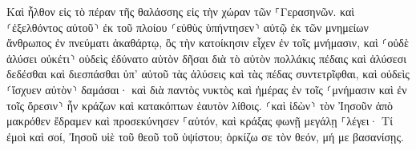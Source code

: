 \documentclass{openreader}
\begin{document}
Καὶ ἦλθον εἰς τὸ πέραν τῆς θαλάσσης εἰς τὴν χώραν τῶν ⸀Γερασηνῶν. 
καὶ ⸂ἐξελθόντος αὐτοῦ⸃ ἐκ τοῦ πλοίου ⸂εὐθὺς ὑπήντησεν⸃ αὐτῷ ἐκ τῶν μνημείων ἄνθρωπος ἐν πνεύματι ἀκαθάρτῳ, 
ὃς τὴν κατοίκησιν εἶχεν ἐν τοῖς μνήμασιν, καὶ ⸂οὐδὲ ἁλύσει οὐκέτι⸃ οὐδεὶς ἐδύνατο αὐτὸν δῆσαι 
διὰ τὸ αὐτὸν πολλάκις πέδαις καὶ ἁλύσεσι δεδέσθαι καὶ διεσπάσθαι ὑπ’ αὐτοῦ τὰς ἁλύσεις καὶ τὰς πέδας συντετρῖφθαι, καὶ οὐδεὶς ⸂ἴσχυεν αὐτὸν⸃ δαμάσαι· 
καὶ διὰ παντὸς νυκτὸς καὶ ἡμέρας ἐν τοῖς ⸂μνήμασιν καὶ ἐν τοῖς ὄρεσιν⸃ ἦν κράζων καὶ κατακόπτων ἑαυτὸν λίθοις. 
⸂καὶ ἰδὼν⸃ τὸν Ἰησοῦν ἀπὸ μακρόθεν ἔδραμεν καὶ προσεκύνησεν ⸀αὐτόν, 
καὶ κράξας φωνῇ μεγάλῃ ⸀λέγει· Τί ἐμοὶ καὶ σοί, Ἰησοῦ υἱὲ τοῦ θεοῦ τοῦ ὑψίστου; ὁρκίζω σε τὸν θεόν, μή με βασανίσῃς. 
\end{document}
